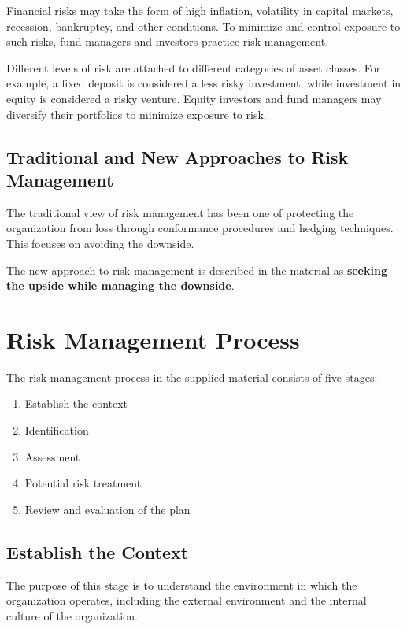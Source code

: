 \documentclass[
]{book}
\providecommand{\tightlist}{%
  \setlength{\itemsep}{0pt}\setlength{\parskip}{0pt}}
\begin{document}
Financial risks may take the form of high inflation, volatility in capital markets, recession, bankruptcy, and other conditions. To minimize and control exposure to such risks, fund managers and investors practice risk management.

Different levels of risk are attached to different categories of asset classes. For example, a fixed deposit is considered a less risky investment, while investment in equity is considered a risky venture. Equity investors and fund managers may diversify their portfolios to minimize exposure to risk.

\section{Traditional and New Approaches to Risk Management}\label{traditional-and-new-approaches-to-risk-management}

The traditional view of risk management has been one of protecting the organization from loss through conformance procedures and hedging techniques. This focuses on avoiding the downside.

The new approach to risk management is described in the material as \textbf{seeking the upside while managing the downside}.

\chapter{Risk Management Process}\label{risk-management-process}

The risk management process in the supplied material consists of five stages:

\begin{enumerate}
\def\labelenumi{\arabic{enumi}.}
\tightlist
\item
  Establish the context
\item
  Identification
\item
  Assessment
\item
  Potential risk treatment
\item
  Review and evaluation of the plan
\end{enumerate}

\section{Establish the Context}\label{establish-the-context}

The purpose of this stage is to understand the environment in which the organization operates, including the external environment and the internal culture of the organization.
\end{document}
